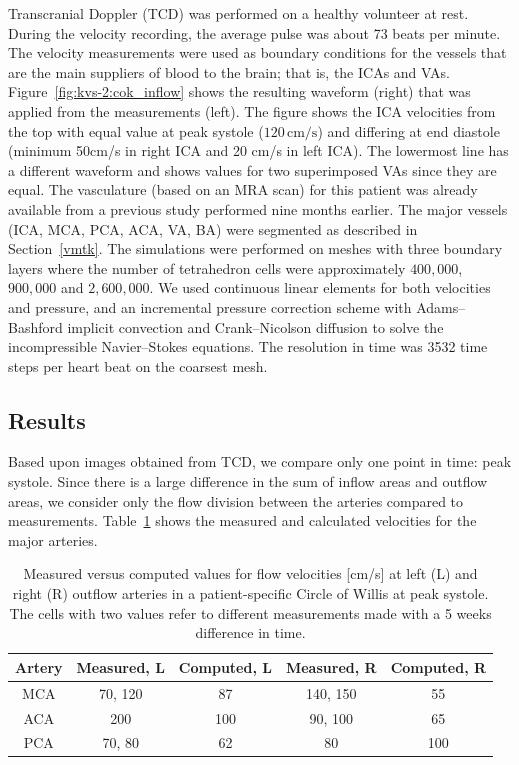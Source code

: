 Transcranial Doppler (TCD) was performed on a healthy volunteer at
rest. During the velocity recording, the average pulse was about 73
beats per minute. The velocity measurements were used as boundary
conditions for the vessels that are the main suppliers of blood to the
brain; that is, the ICAs and VAs. Figure~\ref{fig:kvs-2:cok_inflow}
shows the resulting waveform (right) that was applied from the
measurements (left). The figure shows the ICA velocities from the top
with equal value at peak systole ($120\,\mathrm{cm}/\mathrm{s}$) and
differing at end diastole (minimum 50cm/s in right ICA and 20 cm/s in
left ICA). The lowermost line has a different waveform and shows
values for two superimposed VAs since they are equal. The vasculature
(based on an MRA scan) for this patient was already available from a
previous study performed nine months earlier. The major vessels (ICA,
MCA, PCA, ACA, VA, BA) were segmented as described in
Section~\ref{vmtk}. The simulations were performed on meshes with
three boundary layers where the number of tetrahedron cells were
approximately $400,000$, $900,000$ and $2,600,000$. We used continuous
linear elements for both velocities and pressure, and an incremental
pressure correction scheme with Adams--Bashford implicit convection
and Crank--Nicolson diffusion to solve the incompressible
Navier--Stokes equations. The resolution in time was 3532 time steps
per heart beat on the coarsest mesh.

\subsection{Results}

Based upon images obtained from TCD, we compare only one point in
time: peak systole. Since there is a large difference in the sum of
inflow areas and outflow areas, we consider only the flow division
between the arteries compared to measurements.
Table~\ref{measure_vs_comp} shows the measured and calculated
velocities for the major arteries.

\begin{table}
  \centering
  \begin{tabular}  {  c | c | c | c | c }
    Artery &Measured, L&Computed, L &Measured, R&Computed, R \\
    \hline
    MCA & 70, 120 		& 87  & 140, 150 	& 55	\\
    ACA & 200  		& 100  	& 90, 100 	& 65	\\
    PCA & 70, 80  		& 62 	& 80  		& 100  \\
  \end{tabular}
  \caption{Measured versus computed values for flow
    velocities [cm/s] at left (L) and right (R) outflow arteries in a patient-specific Circle of Willis at peak
    systole. The cells with two values refer to different measurements
    made with a 5 weeks difference in time.}
  \label{measure_vs_comp}
\end{table}

